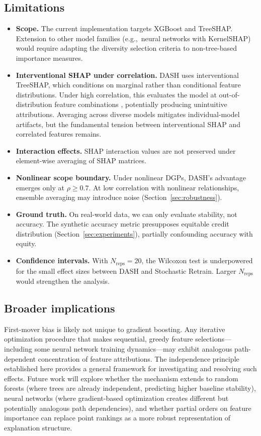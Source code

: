 \documentclass[11pt]{article}
\newcommand{\dash}{\textsc{DASH}}
\newcommand{\rhovar}{\rho}
\newcommand{\eg}{e.g.,\ }
\begin{document}
\subsection{Limitations}

\begin{itemize}
  \item \textbf{Scope.} The current implementation targets XGBoost and
    TreeSHAP. Extension to other model families (\eg neural networks
    with KernelSHAP) would require adapting the diversity selection
    criteria to non-tree-based importance measures.
  \item \textbf{Interventional SHAP under correlation.} DASH uses
    interventional TreeSHAP, which conditions on marginal rather than
    conditional feature distributions. Under high correlation, this
    evaluates the model at out-of-distribution feature combinations
    \citep{janzing2020feature, aas2021explaining}, potentially
    producing unintuitive attributions. Averaging across diverse models
    mitigates individual-model artifacts, but the fundamental tension
    between interventional SHAP and correlated features remains.
  \item \textbf{Interaction effects.} SHAP interaction values are not
    preserved under element-wise averaging of SHAP matrices.
  \item \textbf{Nonlinear scope boundary.} Under nonlinear DGPs,
    \dash{}'s advantage emerges only at $\rhovar \geq 0.7$. At low
    correlation with nonlinear relationships, ensemble averaging may
    introduce noise (Section~\ref{sec:robustness}).
  \item \textbf{Ground truth.} On real-world data, we can only evaluate
    stability, not accuracy. The synthetic accuracy metric presupposes
    equitable credit distribution (Section~\ref{sec:experiments}),
    partially confounding accuracy with equity.
  \item \textbf{Confidence intervals.} With $N_{\text{reps}} = 20$, the
    Wilcoxon test is underpowered for the small effect sizes between
    \dash{} and Stochastic Retrain. Larger $N_{\text{reps}}$ would
    strengthen the analysis.
\end{itemize}

\subsection{Broader implications}

First-mover bias is likely not unique to gradient boosting. Any
iterative optimization procedure that makes sequential, greedy feature
selections---including some neural network training dynamics---may exhibit
analogous path-dependent concentration of feature attributions. The
independence principle established here provides a general framework for
investigating and resolving such effects. Future work will explore
whether the mechanism extends to random forests (where trees are
already independent, predicting higher baseline stability), neural
networks (where gradient-based optimization creates different but
potentially analogous path dependencies), and whether partial orders
on feature importance can replace point rankings as a more robust
representation of explanation structure.
\end{document}
